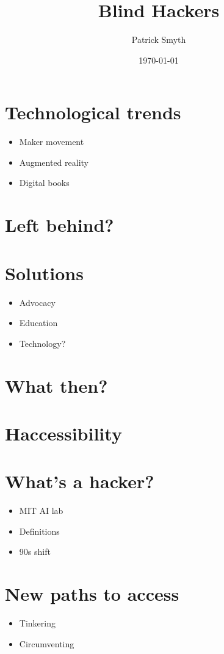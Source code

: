 \documentclass[11pt]{article}
\author{Patrick Smyth}
\date{\today}
\title{Blind Hackers}
\begin{document}
\maketitle

\section*{Technological trends}
\label{sec:orgheadline1}
\begin{itemize}
\item Maker movement
\item Augmented reality
\item Digital books
\end{itemize}
\section*{Left behind?}
\label{sec:orgheadline2}
\section*{Solutions}
\label{sec:orgheadline3}
\begin{itemize}
\item Advocacy
\item Education
\item Technology?
\end{itemize}
\section*{What then?}
\label{sec:orgheadline4}
\section*{Haccessibility}
\label{sec:orgheadline5}
\section*{What's a hacker?}
\label{sec:orgheadline6}
\begin{itemize}
\item MIT AI lab
\item Definitions
\item 90s shift
\end{itemize}
\section*{New paths to access}
\label{sec:orgheadline7}
\begin{itemize}
\item Tinkering
\item Circumventing
\end{itemize}
\end{document}
